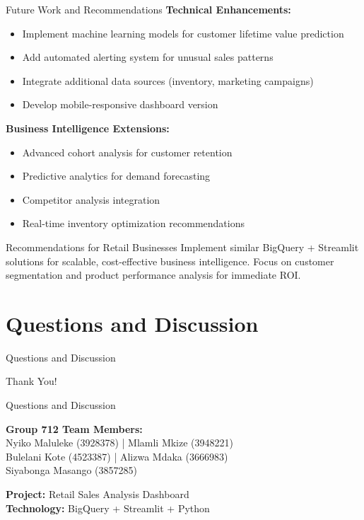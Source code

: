 \documentclass[aspectratio=169]{beamer}
\begin{document}
\begin{frame}{Future Work and Recommendations}
\textbf{Technical Enhancements:}
\begin{itemize}
    \item Implement machine learning models for customer lifetime value prediction
    \item Add automated alerting system for unusual sales patterns
    \item Integrate additional data sources (inventory, marketing campaigns)
    \item Develop mobile-responsive dashboard version
\end{itemize}

\vspace{0.5cm}

\textbf{Business Intelligence Extensions:}
\begin{itemize}
    \item Advanced cohort analysis for customer retention
    \item Predictive analytics for demand forecasting
    \item Competitor analysis integration
    \item Real-time inventory optimization recommendations
\end{itemize}

\vspace{0.5cm}

\begin{exampleblock}{Recommendations for Retail Businesses}
Implement similar BigQuery + Streamlit solutions for scalable, cost-effective business intelligence. Focus on customer segmentation and product performance analysis for immediate ROI.
\end{exampleblock}
\end{frame}

\section{Questions and Discussion}

\begin{frame}{Questions and Discussion}
\begin{center}
\Huge Thank You!

\vspace{1cm}

\Large Questions and Discussion

\vspace{1cm}

\normalsize
\textbf{Group 712 Team Members:}\\
Nyiko Maluleke (3928378) | Mlamli Mkize (3948221)\\
Bulelani Kote (4523387) | Alizwa Mdaka (3666983)\\
Siyabonga Masango (3857285)

\vspace{0.5cm}
\textbf{Project:} Retail Sales Analysis Dashboard\\
\textbf{Technology:} BigQuery + Streamlit + Python
\end{center}
\end{frame}
\end{document}
